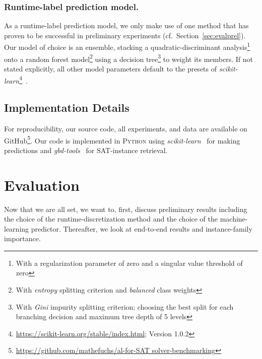 \documentclass[runningheads]{llncs}
\begin{document}
\subsubsection{Runtime-label prediction model.}
As a runtime-label prediction model, we only make use of one method that has proven to be successful in preliminary experiments (cf.~Section~\ref{sec:evalprel}).
Our model of choice is an ensemble, stacking a quadratic-discriminant analysis\footnote{With a regularization parameter of zero and a singular value threshold of zero} onto a random forest model\footnote{With \emph{entropy} splitting criterion and \emph{balanced} class weights} using a decision tree\footnote{With \emph{Gini} impurity splitting criterion; choosing the best split for each branching decision and maximum tree depth of 5 levels} to weight its members.
If not stated explicitly, all other model parameters default to the presets of \emph{scikit-learn}\footnote{\url{https://scikit-learn.org/stable/index.html}; Version 1.0.2}~\cite{scikit-learn}.


\subsection{Implementation Details}
For reproducibility, our source code, all experiments, and data are available on GitHub\footnote{\url{https://github.com/mathefuchs/al-for-SAT solver-benchmarking}}.
Our code is implemented in \textsc{Python} using \emph{scikit-learn}~\cite{scikit-learn} for making predictions and \emph{gbd-tools}~\cite{IserS18} for SAT-instance retrieval.


\section{Evaluation}
\label{sec:eval}
Now that we are all set, we want to, first, discuss preliminary results including the choice of the runtime-discretization method and the choice of the machine-learning predictor.
Thereafter, we look at end-to-end results and instance-family importance.
\end{document}
